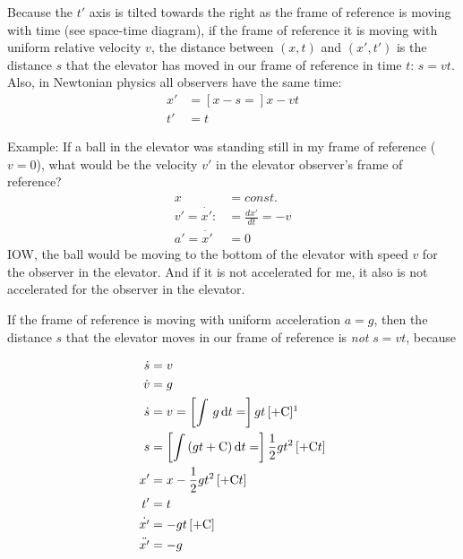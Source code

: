 \documentclass[pagesize,headsepline,10pt,parskip=half,BCOR=12mm]{scrreprt}
\begin{document}
      Because the $t'$ axis is tilted towards the right as the
      frame of reference is moving with time (see space-time
      diagram), if the frame of reference it is moving with
      uniform relative velocity $v$, the distance between $(x, t)$
      and $(x', t')$ is the distance $s$ that the elevator has
      moved in our frame of reference in time $t$: $s = vt$.
      Also, in Newtonian physics all observers have the same time:
      \begin{align}
        x' &= \left[x - s =\right] x - vt\\
        t' &= t
      \end{align}

      Example: If a ball in the elevator was standing still in my
      frame of reference ($v = 0$), what would be the velocity $v'$
      in the elevator observer's frame of reference?
      \begin{align}
        x &= const.\\
        v' = \dot{x'} :&= \frac{dx'}{dt} = -v \\
        a' = \ddot{x'} &= 0
      \end{align}
      IOW, the ball would be moving to the bottom of the elevator
      with speed $v$ for the observer in the elevator.  And if it
      is not accelerated for me, it also is not accelerated for the
      observer in the elevator.

      If the frame of reference is moving with uniform
      acceleration $a=g$, then the distance $s$ that the elevator
      moves in our frame of reference is \emph{not} $s = vt$,
      because

      \begin{align}
        \dot{s} &= v \\
        \dot{v} &= g \\
        \dot{s} &= v = \left[\int\, g\,\mathrm{d}t =\right]
        gt\,[+ \mathrm{C}]\footnotemark
        \\
        s &= \left[\int\, (gt + \mathrm{C})\,\mathrm{d}t
        =\right] \frac{1}{2} gt^2\,[+ \mathrm{C}t] \\
        x' &= x - \frac{1}{2} gt^2\,[+ \mathrm{C}t] \\
        t' &= t \\
        \dot{x'} &= -gt\,[+ \mathrm{C}] \\
        \ddot{x'} &= -g
      \end{align}
\end{document}
